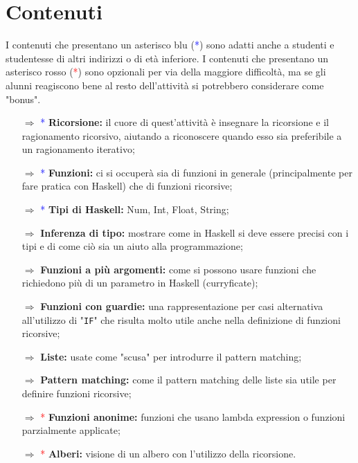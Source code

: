 \paragraph{}


\pagebreak

\section{Contenuti}

I contenuti che presentano un asterisco blu (\textcolor{blue}{*}) sono
adatti anche a studenti e studentesse di altri indirizzi o di età inferiore. I contenuti che presentano un asterisco rosso (\textcolor{red}{*}) sono
opzionali per via della maggiore difficoltà, ma se gli alunni reagiscono bene al resto dell'attività
si potrebbero considerare come "bonus".

\begin{itemize}
    \item [$\Rightarrow$] \textcolor{blue}{*} \textbf{Ricorsione:} il cuore di quest'attività è insegnare la ricorsione e il
    ragionamento ricorsivo, aiutando a riconoscere quando esso sia preferibile a un ragionamento iterativo;
    \item [$\Rightarrow$] \textcolor{blue}{*} \textbf{Funzioni:} ci si occuperà sia di funzioni in generale (principalmente per fare pratica con Haskell)
    che di funzioni ricorsive;
    \item [$\Rightarrow$] \textcolor{blue}{*} \textbf{Tipi di Haskell:} Num, Int, Float, String;
    \item [$\Rightarrow$] \textbf{Inferenza di tipo:} mostrare come in Haskell si deve essere precisi con i tipi e di come ciò sia un aiuto alla programmazione;
    \item [$\Rightarrow$] \textbf{Funzioni a più argomenti:} come si possono usare funzioni che richiedono più di un parametro in Haskell (curryficate);
    \item [$\Rightarrow$] \textbf{Funzioni con guardie:} una rappresentazione per casi alternativa all'utilizzo di "\texttt{IF}" che risulta molto utile
    anche nella definizione di funzioni ricorsive;
    \item [$\Rightarrow$] \textbf{Liste:} usate come "scusa" per introdurre il pattern matching;
    \item [$\Rightarrow$] \textbf{Pattern matching:} come il pattern matching delle liste sia utile per definire funzioni ricorsive;
    \item [$\Rightarrow$] \textcolor{red}{*} \textbf{Funzioni anonime:} funzioni che usano lambda expression o funzioni parzialmente applicate;
    \item [$\Rightarrow$] \textcolor{red}{*} \textbf{Alberi:} visione di un albero con l'utilizzo della ricorsione.
\end{itemize}

